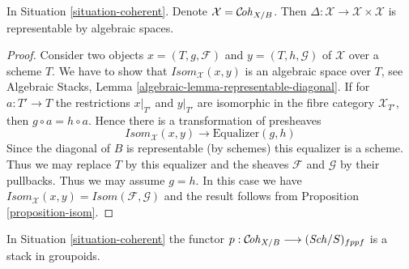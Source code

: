 \begin{lemma}
\label{lemma-coherent-diagonal}
In Situation \ref{situation-coherent}. Denote
$\mathcal{X} = \mathcal{C}\!\mathit{oh}_{X/B}$. Then
$\Delta : \mathcal{X} \to \mathcal{X} \times \mathcal{X}$ is
representable by algebraic spaces.
\end{lemma}

\begin{proof}
Consider two objects $x = (T, g, \mathcal{F})$ and $y = (T, h, \mathcal{G})$
of $\mathcal{X}$ over a scheme $T$. We have to show that
$\mathit{Isom}_\mathcal{X}(x, y)$ is an algebraic space over $T$, see
Algebraic Stacks, Lemma \ref{algebraic-lemma-representable-diagonal}.
If for $a : T' \to T$ the restrictions $x|_{T'}$ and $y|_{T'}$ are isomorphic
in the fibre category $\mathcal{X}_{T'}$, then $g \circ a = h \circ a$.
Hence there is a transformation of presheaves
$$
\mathit{Isom}_\mathcal{X}(x, y) \longrightarrow \text{Equalizer}(g, h)
$$
Since the diagonal of $B$ is representable (by schemes) this equalizer is
a scheme. Thus we may replace $T$ by this equalizer and the sheaves
$\mathcal{F}$ and $\mathcal{G}$ by their pullbacks. Thus we may assume
$g = h$. In this case we have
$\mathit{Isom}_\mathcal{X}(x, y) = \mathit{Isom}(\mathcal{F}, \mathcal{G})$
and the result follows from Proposition \ref{proposition-isom}.
\end{proof}

\begin{lemma}
\label{lemma-coherent-stack}
In Situation \ref{situation-coherent} the functor
$p : \mathcal{C}\!\mathit{oh}_{X/B} \longrightarrow (\mathit{Sch}/S)_{fppf}$
is a stack in groupoids.
\end{lemma}

